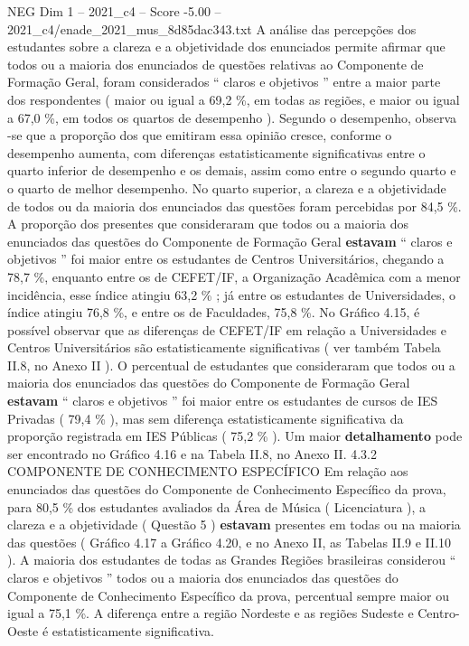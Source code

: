 \begin{textsample}{NEG Dim 1 – 2021\_c4 – Score -5.00 – 2021\_c4/enade\_2021\_mus\_8d85dac343.txt}
A análise das percepções dos estudantes sobre a clareza e a objetividade dos enunciados permite afirmar que todos ou a maioria dos enunciados de questões relativas ao Componente de Formação Geral, foram considerados “ claros e objetivos ” entre a maior parte dos respondentes ( maior ou igual a 69,2 \%, em todas as regiões, e maior ou igual a 67,0 \%, em todos os quartos de desempenho ).
Segundo o desempenho, observa -se que a proporção dos que emitiram essa opinião cresce, conforme o desempenho aumenta, com diferenças estatisticamente significativas entre o quarto inferior de desempenho e os demais, assim como entre o segundo quarto e o quarto de melhor desempenho.
No quarto superior, a clareza e a objetividade de todos ou da maioria dos enunciados das questões foram percebidas por 84,5 \%.
A proporção dos presentes que consideraram que todos ou a maioria dos enunciados das questões do Componente de Formação Geral \textbf{estavam} “ claros e objetivos ” foi maior entre os estudantes de Centros Universitários, chegando a 78,7 \%, enquanto entre os de CEFET/IF, a Organização Acadêmica com a menor incidência, esse índice atingiu 63,2 \% ; já entre os estudantes de Universidades, o índice atingiu 76,8 \%, e entre os de Faculdades, 75,8 \%.
No Gráfico 4.15, é possível observar que as diferenças de CEFET/IF em relação a Universidades e Centros Universitários são estatisticamente significativas ( ver também Tabela II.8, no Anexo II ).
O percentual de estudantes que consideraram que todos ou a maioria dos enunciados das questões do Componente de Formação Geral \textbf{estavam} “ claros e objetivos ” foi maior entre os estudantes de cursos de IES Privadas ( 79,4 \% ), mas sem diferença estatisticamente significativa da proporção registrada em IES Públicas ( 75,2 \% ).
Um maior \textbf{detalhamento} pode ser encontrado no Gráfico 4.16 e na Tabela II.8, no Anexo II. 4.3.2 COMPONENTE DE CONHECIMENTO ESPECÍFICO Em relação aos enunciados das questões do Componente de Conhecimento Específico da prova, para 80,5 \% dos estudantes avaliados da Área de Música ( Licenciatura ), a clareza e a objetividade ( Questão 5 ) \textbf{estavam} presentes em todas ou na maioria das questões ( Gráfico 4.17 a Gráfico 4.20, e no Anexo II, as Tabelas II.9 e II.10 ).
A maioria dos estudantes de todas as Grandes Regiões brasileiras considerou “ claros e objetivos ” todos ou a maioria dos enunciados das questões do Componente de Conhecimento Específico da prova, percentual sempre maior ou igual a 75,1 \%.
A diferença entre a região Nordeste e as regiões Sudeste e Centro-Oeste é estatisticamente significativa.

\end{textsample}
